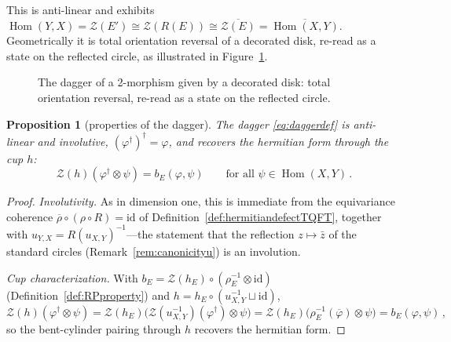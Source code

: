 \documentclass[11pt]{article}
\newtheorem{proposition}[theorem]{Proposition}
\theoremstyle{definition}
\newcommand{\cZ}{\mathcal{Z}}
\newcommand{\dg}{\dagger}
\begin{document}
This is anti-linear and exhibits $\operatorname{Hom}(Y,X) = \cZ(E') \cong \cZ(R(E)) \cong \overline{\cZ(E)} = \overline{\operatorname{Hom}(X,Y)}$. Geometrically it is total orientation reversal of a decorated disk, re-read as a state on the reflected circle, as illustrated in Figure~\ref{fig:daggerdisk}.

\begin{figure}[ht]
\centering
{}
\hspace{0.7cm}
\raisebox{-2pt}{$\xmapsto{\ \dg\ }$}
\hspace{0.7cm}
\caption{The dagger of a 2-morphism given by a decorated disk: total orientation reversal, re-read as a state on the reflected circle. }
\label{fig:daggerdisk}
\end{figure}

\begin{proposition}[properties of the dagger]
\label{prop:daggerprops}
The dagger \eqref{eq:daggerdef} is anti-linear and involutive, $(\varphi^\dg)^\dg = \varphi$, and recovers the hermitian form through the cup $h$:
\begin{equation}
  \cZ(h)(\varphi^\dg \otimes \psi) = b_E(\varphi, \psi)
  \qquad \text{for all } \psi \in \operatorname{Hom}(X,Y) \, .
\end{equation}
\end{proposition}

\begin{proof}
\emph{Involutivity.} As in dimension one, this is immediate from the equivariance coherence $\overline{\rho} \circ (\rho \circ R) = \mathrm{id}$ of Definition~\ref{def:hermitiandefectTQFT}, together with $u_{Y,X} = R(u_{X,Y})^{-1}$---the statement that the reflection $z \mapsto \bar z$ of the standard circles (Remark~\ref{rem:canonicityu}) is an involution. 

\emph{Cup characterization.} With $b_E = \cZ(h_E) \circ (\rho_E^{-1} \otimes \mathrm{id})$ (Definition~\ref{def:RPproperty}) and $h = h_E \circ (u_{X,Y}^{-1} \sqcup \mathrm{id})$,
\begin{equation}
  \cZ(h)(\varphi^\dg \otimes \psi)
  = \cZ(h_E)\big(\cZ(u_{X,Y}^{-1})(\varphi^\dg) \otimes \psi\big)
  = \cZ(h_E)\big(\rho_E^{-1}(\overline{\varphi}) \otimes \psi\big)
  = b_E(\varphi, \psi) \, ,
\end{equation}
so the bent-cylinder pairing through $h$ recovers the hermitian form.
\end{proof}
\end{document}
